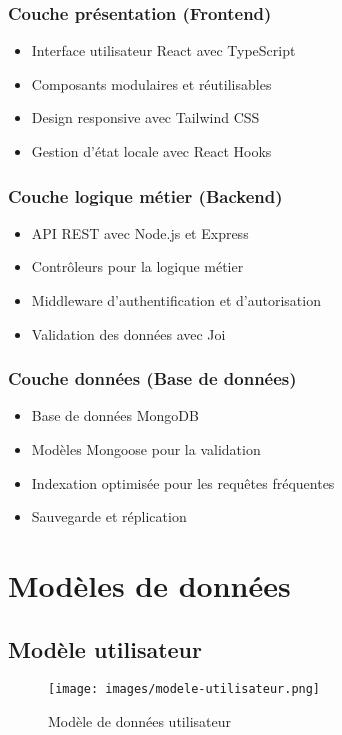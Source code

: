 \subsubsection{Couche présentation (Frontend)}
\begin{itemize}
    \item Interface utilisateur React avec TypeScript
    \item Composants modulaires et réutilisables
    \item Design responsive avec Tailwind CSS
    \item Gestion d'état locale avec React Hooks
\end{itemize}

\subsubsection{Couche logique métier (Backend)}
\begin{itemize}
    \item API REST avec Node.js et Express
    \item Contrôleurs pour la logique métier
    \item Middleware d'authentification et d'autorisation
    \item Validation des données avec Joi
\end{itemize}

\subsubsection{Couche données (Base de données)}
\begin{itemize}
    \item Base de données MongoDB
    \item Modèles Mongoose pour la validation
    \item Indexation optimisée pour les requêtes fréquentes
    \item Sauvegarde et réplication
\end{itemize}

\section{Modèles de données}
\subsection{Modèle utilisateur}
\begin{figure}[h]
\centering
\texttt{[image: images/modele-utilisateur.png]}
\caption{Modèle de données utilisateur}
\label{fig:modele-utilisateur}
\end{figure}


